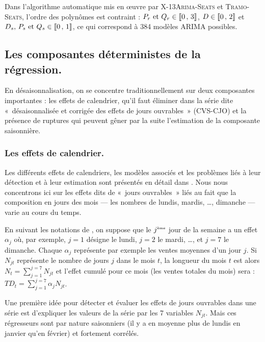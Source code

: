 \documentclass[12pt, a4paper, french]{article}
\begin{document}
Dans l'algorithme automatique mis en œuvre par \textsc{X-13Arima-Seats} et \textsc{Tramo-Seats}, l'ordre des polynômes est contraint : $P_r\text{ et }Q_r\in \llbracket 0\,,\, 3 \rrbracket$, $D\in \llbracket 0\,,\, 2 \rrbracket$ et $D_s,\, P_s \text{ et } Q_s\in \llbracket 0\,,\, 1 \rrbracket$, ce qui correspond à 384 modèles ARIMA possibles. 


\subsection{Les composantes déterministes de la régression.}

En désaisonnalisation, on se concentre traditionnellement sur deux composantes importantes : les effets de calendrier, qu'il faut éliminer dans la série dite «~désaisonnalisée et corrigée des effets de jours ouvrables~» (CVS-CJO) et la présence de ruptures qui peuvent gêner par la suite l'estimation de la composante saisonnière.

\subsubsection{Les effets de calendrier.}

Les différents effets de calendriers, les modèles associés et les problèmes liés à leur détection et à leur estimation sont présentés en détail dans \cite{L2018}. Nous nous concentrons ici sur les effets dits de «~jours ouvrables~» liés au fait que la composition en jours des mois --- les nombres de lundis, mardis, \dots, dimanche --- varie au cours du temps.

En suivant les notations de \cite{FMBOC1998}, on suppose que le $j^{\mbox{\tiny {\`{e}me}}}$ jour de la semaine a un effet $\alpha_j$ où, par exemple, $j=1$ désigne le lundi, $j=2$ le mardi, \dots, et $j=7$ le dimanche. Chaque $\alpha_j$ représente par exemple les ventes moyennes d'un jour $j$. Si $N_{jt}$ représente le nombre de jours $j$ dans le mois $t$, la longueur du mois $t$ est alors $N_t = \sum_{j=1}^{j=7} N_{jt}$ et l'effet cumulé pour ce mois (les ventes totales du mois) sera :
$TD_t = \sum_{j=1}^{j=7} \alpha_j N_{jt}$.

Une première idée pour détecter et évaluer les effets de jours ouvrables dans une série est d'expliquer les valeurs de la série par les 7 variables $N_{jt}$. Mais ces régresseurs sont par nature saisonniers (il y a en moyenne plus de lundis en janvier qu'en février) et fortement corrélés. 
\end{document}
